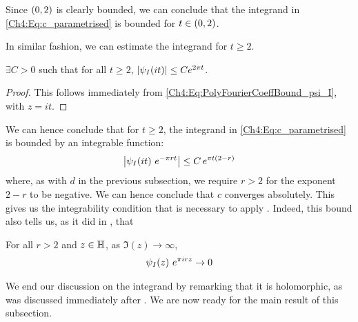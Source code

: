 Since $\left( 0, 2 \right)$ is clearly bounded, we can conclude that the integrand in \eqref{Ch4:Eq:c_parametrised} is bounded for $t \in \left( 0, 2 \right)$.

In similar fashion, we can estimate the integrand for $t \geq 2$.

\begin{boxlemma}
    $\exists C > 0$ such that for all $t \geq 2$, $\left\lvert \psi_I\!\left( it \right) \right\rvert \leq C e^{2 \pi t}$.
\end{boxlemma}
\begin{proof}
    This follows immediately from \eqref{Ch4:Eq:PolyFourierCoeffBound_psi_I}, with $z = it$.
\end{proof}

We can hence conclude that for $t \geq 2$, the integrand in \eqref{Ch4:Eq:c_parametrised} is bounded by an integrable function:
\begin{align*}
    \left\lvert \psi_I\!\left( it \right) \, e^{- \pi r t} \right\rvert \leq C \, e^{\pi t \left( 2 - r \right)}
\end{align*}
where, as with $d$ in the previous subsection, we require $r > 2$ for the exponent $2 - r$ to be negative. We can hence conclude that $c$ converges absolutely. This gives us the integrability condition that is necessary to apply . Indeed, this bound also tells us, as it did in , that
\begin{boxlemma}
    For all $r > 2$ and $z \in \mathbb{H}$, as $\Im(z) \to \infty$,
    \begin{align*}
        \psi_I\!\left( z \right) \, e^{\pi i r z} \to 0
    \end{align*}
\end{boxlemma}

We end our discussion on the integrand by remarking that it is holomorphic, as was discussed immediately after . We are now ready for the main result of this subsection.

